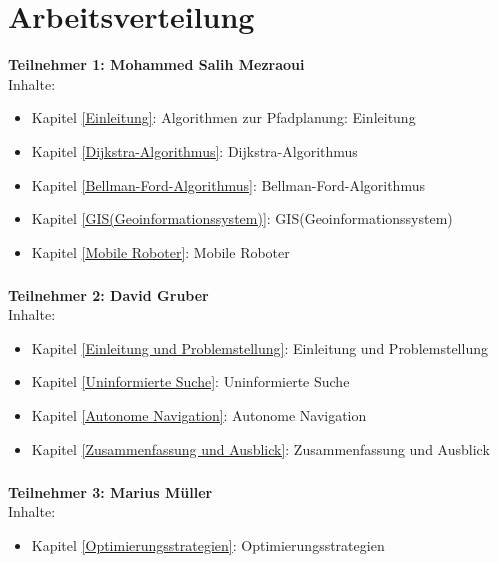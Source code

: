 \chapter*{Arbeitsverteilung}

\textbf{Teilnehmer 1: Mohammed Salih Mezraoui} 
\\
 Inhalte:
 \begin{itemize}
    \item Kapitel \ref{Einleitung}: Algorithmen zur Pfadplanung: Einleitung
    \item Kapitel \ref{Dijkstra-Algorithmus}: Dijkstra-Algorithmus
    \item Kapitel \ref{Bellman-Ford-Algorithmus}: Bellman-Ford-Algorithmus
    \item Kapitel \ref{GIS(Geoinformationssystem)}: GIS(Geoinformationssystem)
    \item Kapitel \ref{Mobile Roboter}: Mobile Roboter
\end{itemize}
\paragraph*{}
\textbf{Teilnehmer 2: David Gruber} 
\\
Inhalte: 
\begin{itemize}
    \item Kapitel \ref{Einleitung und Problemstellung}: Einleitung und Problemstellung
    \item Kapitel \ref{Uninformierte Suche}: Uninformierte Suche
    \item Kapitel \ref{Autonome Navigation}: Autonome Navigation
    \item Kapitel \ref{Zusammenfassung und Ausblick}: Zusammenfassung und Ausblick
\end{itemize}
\paragraph*{}
\textbf{Teilnehmer 3: Marius Müller} 
\\
 Inhalte: 
\begin{itemize}
	\item Kapitel \ref{Optimierungsstrategien}: Optimierungsstrategien
\end{itemize}